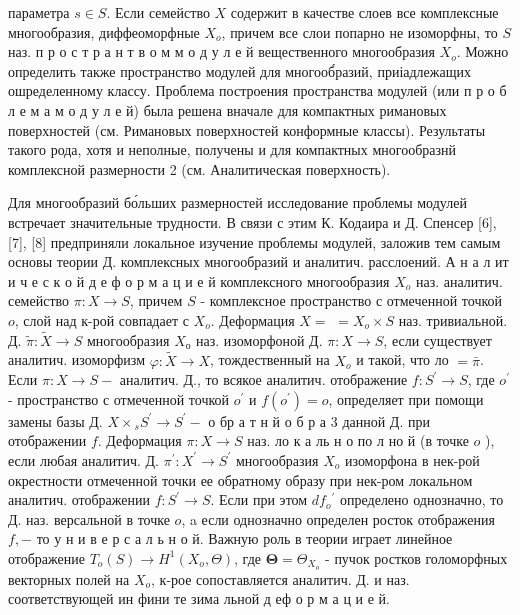 \documentclass[10pt]{article}
\begin{document}
параметра $s \in S$. Если семейство $X$ содержит в качестве слоев все комплексные многообразия, диффеоморфные $X_{o}$, причем все слои попарно не изоморфны, то $S$ наз. п р о с т р а н т в о м м о д у л е й вещественного многообразия $X_{o}$. Можно определить также пространство модулей для многооб́разий, приіадлежащих ошределенному классу. Проблема построения пространства модулей (или п р о б л е м а м о д у л е й) была решена вначале для компактных римановых поверхностей (см. Римановых поверхностей конформные классы). Результаты такого рода, хотя и неполные, получены и для компактных многообразнй комплексной размерности 2 (см. Аналитическая поверхность).



Для многообразий бо́льших размерностей исследование проблемы модулей встречает значительные трудности. В связи с этим К. Кодаира и Д. Спенсер [6], [7], [8] предприняли локальное изучение проблемы модулей, заложив тем самым основы теории Д. комплексных многообразий и аналитич. расслоений. А н а л ит и ч е с к о й д е ф о р м а ц и е й комплексного многообразия $X_{o}$ наз. аналитич. семейство $\pi: X \rightarrow S$, причем $S$ - комплексное пространство с отмеченной точкой $o$, слой над к-рой совпадает с $X_{o}$. Деформация $X=$ $=X_{o} \times S$ наз. тривиальной. Д. $\tilde{\pi}: \tilde{X} \rightarrow S$ многообразия $X_{о}$ наз. изоморфоной Д. $\pi: X \rightarrow S$, если существует аналитич. изоморфизм $\varphi: \tilde{X} \rightarrow X$, тождественный на $X_{o}$ и такой, что ло $=\bar{\pi}$. Если $\pi: X \rightarrow S-$ аналитич. Д., то всякое аналитич. отображение $f: S^{\prime} \rightarrow S$, где $o^{\prime}$ - пространство с отмеченной точкой $o^{\prime}$ и $f\left(o^{\prime}\right)=o$, определяет при помощи замены базы Д. $X \times{ }_{s} S^{\prime} \rightarrow S^{\prime}-$ о бр а т н й о б р а 3 данной Д. при отображении $f$. Деформация $\pi: X \rightarrow S$ наз. ло к а ль н о по л но й (в точке $o$ ), если любая аналитич. Д. $\pi^{\prime}: X^{\prime} \rightarrow S^{\prime}$ многообразия $X_{o}$ изоморфона в нек-рой окрестности отмеченной точки ее обратному образу при нек-ром локальном аналитич. отображении $f: S^{\prime} \rightarrow S$. Если при этом $d f_{o}{ }^{\prime}$ определено однозначно, то Д. наз. версальной в точке $o$, a если однозначно определен росток отображения $f,-$ то у н и в е р с а л ь н о й. Важную роль в теории играет линейное отображение $T_{o}(S) \rightarrow H^{1}\left(X_{o}, \Theta\right)$, где $\boldsymbol{\Theta}=\Theta_{X_{o}}$ - пучок ростков голоморфных векторных полей на $X_{o}$, к-рое сопоставляется аналитич. Д. и наз. соответствующей ин фини те зима льной д еф о р м а ц и е й.
\end{document}
